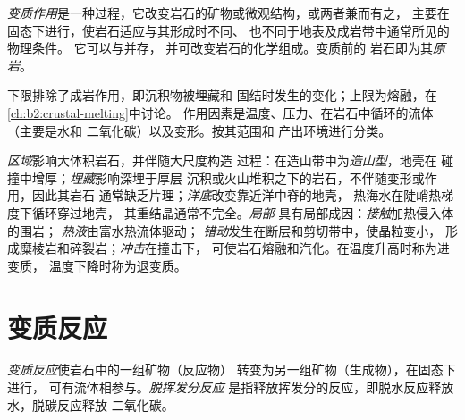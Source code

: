 \begin{definition}[变质作用；原岩]\label{def:b2:metamorphic-facies:metamorphism}
\emph{变质作用}是一种过程，它改变岩石的矿物或微观结构，或两者兼而有之，
主要在固态下进行，使岩石适应与其形成时不同、
也不同于地表及成岩带中通常所见的物理条件。
它可以与并存，
并可改变岩石的化学组成。变质前的
岩石即为其\emph{原岩}。
\end{definition}

下限排除了成岩作用，即沉积物被埋藏和
固结时发生的变化；上限为熔融，在\cref{ch:b2:crustal-melting}中讨论。
作用因素是温度、压力、在岩石中循环的流体（主要是水和
二氧化碳）以及变形。按其范围和
产出环境进行分类。

\emph{区域}影响大体积岩石，并伴随大尺度构造
过程：在造山带中为\emph{造山型}，地壳在
碰撞中增厚；\emph{埋藏}影响深埋于厚层
沉积或火山堆积之下的岩石，不伴随变形或作用，因此其岩石
通常缺乏片理；\emph{洋底}改变靠近洋中脊的地壳，
热海水在陡峭热梯度下循环穿过地壳，
其重结晶通常不完全。\emph{局部}
具有局部成因：\emph{接触}加热侵入体的围岩；
\emph{热液}由富水热流体驱动；
\emph{错动}发生在断层和剪切带中，使晶粒变小，
形成糜棱岩和碎裂岩；\emph{冲击}在撞击下，
可使岩石熔融和汽化。在温度升高时称为进变质，
温度下降时称为退变质。

\section{变质反应}\label{sec:b2:metamorphic-facies:reactions}

\begin{definition}\label{def:b2:metamorphic-facies:reaction}
\emph{变质反应}使岩石中的一组矿物（反应物）
转变为另一组矿物（生成物），在固态下进行，
可有流体相参与。\emph{脱挥发分反应}
是指释放挥发分的反应，即脱水反应释放水，脱碳反应释放
二氧化碳。
\end{definition}

